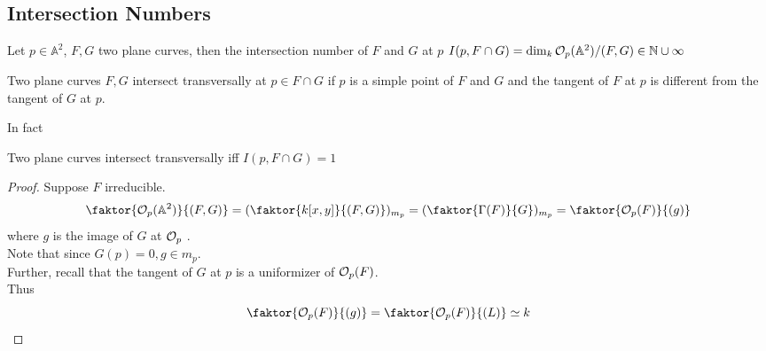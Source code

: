 \documentclass[../main.tex]{subfiles}
\begin{document}
\subsection{Intersection Numbers}
\begin{defn}
	Let $p\in \mathbb{A}^{2}$, $F,G$ two plane curves, then the intersection number of $F$ and $G$ at $p$ $I( p,F\cap G) = \dim_k \mathcal{O}_p( \mathbb{A}^{2}) /( F,G) \in \mathbb{N}\cup \infty 	$ 
\end{defn}
\begin{defn}
	Two plane curves $F,G$ intersect transversally at $p\in F\cap G$ if $p$ is a  simple point of $F$ and $G$ and the tangent of $F$ at $p$ is different from the tangent of $G$ at $p$.
\end{defn}
In fact
\begin{propo}
Two plane curves intersect transversally iff $I( p,F\cap G) =1$ 
\end{propo}
\begin{proof}
	Suppose $F$ irreducible.
\[ 
	\faktor{ \O_p( \mathbb{A}^{2}) }{( F,G) }= ( \faktor{ k[x,y]}{( F,G) })_{m_p} = ( \faktor{\Gamma( F) }{G})_{m_p} = \faktor{\O_p( F) }{( g) }  
\]
where $g$ is the image of $G$ at $\mathcal{O}_p$ .\\
Note that since $G( p) =0, g\in m_p$.\\
Further, recall that the tangent of $G$ at $p$ is a uniformizer of $\mathcal{O}_p( F) $.\\
Thus 
\[ 
\faktor{\O_p( F) }{( g) }= \faktor{\O_p( F) }{( L) }\simeq k
\]

\end{proof}
\end{document}
